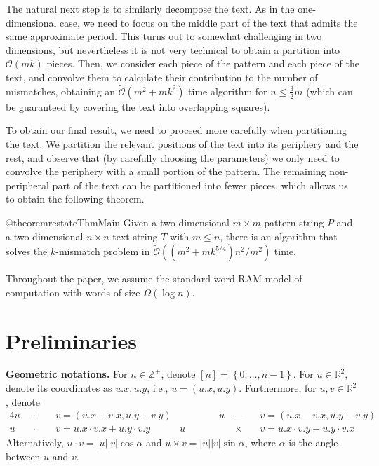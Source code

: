 \documentclass[a4paper,11pt]{article}
\newcommand{\R}{\mathbb{R}}
\newcommand{\Z}{\mathbb{Z}}
\renewcommand{\O}{\mathcal{O}}
\newcommand{\tO}{\tilde{\mathcal{O}}}
\renewcommand{\phi}{\varphi}
\newcommand{\set}[1]{\left\lbrace #1 \right\rbrace}
\newcommand{\absolute}[1]{\left\lvert#1\right\rvert}
\begin{document}
The natural next step is to similarly decompose the text. As in the one-dimensional case, we
need to focus on the middle part of the text that admits the same approximate period. This turns out
to somewhat challenging in two dimensions, but nevertheless it is not very technical to obtain
a partition into $\O(mk)$ pieces. Then, we consider each piece of the pattern and each piece of the text,
and convolve them to calculate their contribution to the number of mismatches, obtaining an $\tO(m^{2}+mk^{2})$ time
algorithm for $n\leq \frac{3}{2}m$ (which can be guaranteed by covering the text into overlapping
squares).

To obtain our final result, we need to proceed more carefully when partitioning the text. We partition
the relevant positions of the text into its periphery and the rest, and observe that (by carefully choosing the parameters) we only need to convolve the periphery with a small portion of the pattern. The remaining non-peripheral
part of the text can be partitioned into fewer pieces, which allows us to obtain the following theorem.


\def\mainThmTitle{Informal version}
\def\mainThmContent{%
Given a two-dimensional $m \times m$ pattern string $P$ and a two-dimensional $n \times n$ text string $T$ with $m \le n$,
there is an algorithm that solves the $k$-mismatch problem in $\tO((m^2 + mk^{5/4})n^2 / m^2)$ time.%
}

\begin{restatable}[\mainThmTitle]{@theorem}{restateThmMain}\label{th:main}
\mainThmContent%
\end{restatable}

\noindent Throughout the paper, we assume the standard word-RAM model of computation with words of size $\Omega(\log n)$.

\section{Preliminaries}
\label{sec:preliminaries}
\newcommand{\x}[1]{#1.x}
\newcommand{\y}[1]{#1.y}
\newcommand{\h}[1]{\phi \times #1}
\newcommand{\s}[1]{\psi \times #1}

\textbf{Geometric notations.} For $n \in \Z^+$, denote $[n] = \set{0, \dots, n - 1}$. For $u \in \R^2$, denote its coordinates as $\x{u}, \y{u}$, i.e., $u = (\x{u}, \y{u})$. Furthermore, for $u, v \in \R^2$, denote 
\begin{alignat*}{4}
u &\ +\ &&      v = (\x{u}+\x{v}, \y{u} + \y{v}) & \qquad\qquad
u &\ -\ &&      v = (\x{u}-\x{v}, \y{u}-\y{v})\\
u &\ \;\cdot\ &&  v = \x{u} \cdot \x{v} + \y{u} \cdot \y{v} & 
u &\ \times\ && v = \x{u} \cdot \y{v} - \y{u} \cdot \x{v}
\end{alignat*}
Alternatively, $u \cdot v = \absolute{u}\absolute{v} \cos \alpha$ and $u \times v = \absolute{u}\absolute{v} \sin \alpha$, where $\alpha$ is the angle between $u$ and $v$.
\end{document}
